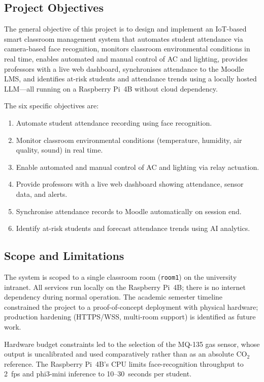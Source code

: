 \subsection{Project Objectives}
\label{subsec:objectives}

The general objective of this project is to design and implement an
IoT-based smart classroom management system that automates student
attendance via camera-based face recognition, monitors classroom
environmental conditions in real time, enables automated and manual
control of AC and lighting, provides professors with a live web
dashboard, synchronises attendance to the Moodle LMS, and identifies
at-risk students and attendance trends using a locally hosted LLM---all
running on a Raspberry Pi~4B without cloud dependency.

The six specific objectives are:
\begin{enumerate}
  \item Automate student attendance recording using face recognition.
  \item Monitor classroom environmental conditions (temperature, humidity,
    air quality, sound) in real time.
  \item Enable automated and manual control of AC and lighting via relay
    actuation.
  \item Provide professors with a live web dashboard showing attendance,
    sensor data, and alerts.
  \item Synchronise attendance records to Moodle automatically on session
    end.
  \item Identify at-risk students and forecast attendance trends using AI
    analytics.
\end{enumerate}

\subsection{Scope and Limitations}
\label{subsec:scope}

The system is scoped to a single classroom room (\texttt{room1}) on the
university intranet.  All services run locally on the Raspberry Pi~4B;
there is no internet dependency during normal operation.  The academic
semester timeline constrained the project to a proof-of-concept
deployment with physical hardware; production hardening (HTTPS/WSS,
multi-room support) is identified as future work.

Hardware budget constraints led to the selection of the MQ-135 gas
sensor, whose output is uncalibrated and used comparatively rather than
as an absolute CO$_2$ reference.  The Raspberry Pi~4B's CPU limits
face-recognition throughput to 2~fps and phi3-mini inference to
10--30~seconds per student.

